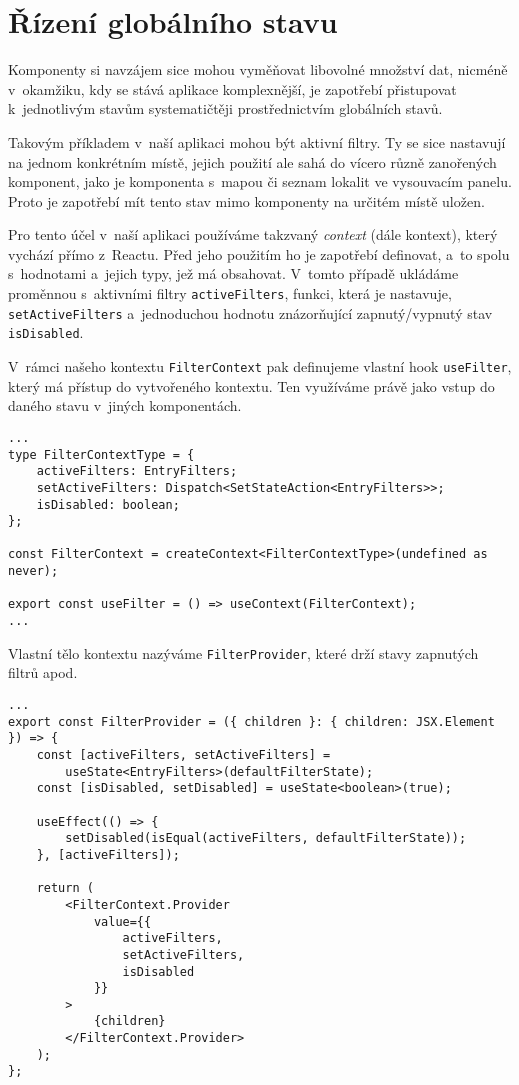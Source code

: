 \hypertarget{ux159uxedzenuxed-globuxe1lnuxedho-stavu}{%
\section{Řízení globálního stavu}\label{ux159uxedzenuxed-globuxe1lnuxedho-stavu}}

Komponenty si navzájem sice mohou vyměňovat libovolné množství dat, nicméně v~okamžiku, kdy se stává aplikace komplexnější, je zapotřebí přistupovat k~jednotlivým stavům systematičtěji prostřednictvím globálních stavů.

Takovým příkladem v~naší aplikaci mohou být aktivní filtry. Ty se sice nastavují na jednom konkrétním místě, jejich použití ale sahá do vícero různě zanořených komponent, jako je komponenta s~mapou či seznam lokalit ve vysouvacím panelu. Proto je zapotřebí mít tento stav mimo komponenty na určitém místě uložen.

Pro tento účel v~naší aplikaci používáme takzvaný \emph{context} (dále kontext), který vychází přímo z~Reactu. Před jeho použitím ho je zapotřebí definovat, a~to spolu s~hodnotami a~jejich typy, jež má obsahovat. V~tomto případě ukládáme proměnnou s~aktivními filtry \verb|activeFilters|, funkci, která je nastavuje, \verb|setActiveFilters| a~jednoduchou hodnotu znázorňující zapnutý/vypnutý stav \verb|isDisabled|.

V~rámci našeho kontextu \verb|FilterContext| pak definujeme vlastní hook \verb|useFilter|, který má přístup do vytvořeného kontextu. Ten využíváme právě jako vstup do daného stavu v~jiných komponentách.

\begin{verbatim}
...
type FilterContextType = {
    activeFilters: EntryFilters;
    setActiveFilters: Dispatch<SetStateAction<EntryFilters>>;
    isDisabled: boolean;
};

const FilterContext = createContext<FilterContextType>(undefined as never);

export const useFilter = () => useContext(FilterContext);
...
\end{verbatim}

Vlastní tělo kontextu nazýváme \verb|FilterProvider|, které drží stavy zapnutých filtrů apod.

\begin{verbatim}
...
export const FilterProvider = ({ children }: { children: JSX.Element }) => {
    const [activeFilters, setActiveFilters] =
        useState<EntryFilters>(defaultFilterState);
    const [isDisabled, setDisabled] = useState<boolean>(true);

    useEffect(() => {
        setDisabled(isEqual(activeFilters, defaultFilterState));
    }, [activeFilters]);

    return (
        <FilterContext.Provider
            value={{
                activeFilters,
                setActiveFilters,
                isDisabled
            }}
        >
            {children}
        </FilterContext.Provider>
    );
};
\end{verbatim}

